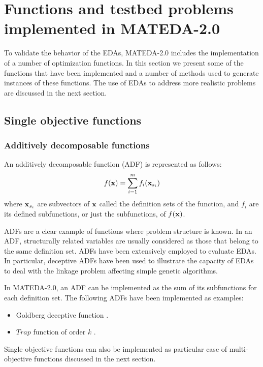 \documentclass[a4paper]{article}
\begin{document}
\section{Functions and testbed problems implemented in MATEDA-2.0}

To validate the behavior of the EDAs, MATEDA-2.0 includes the
implementation of a number of optimization functions. In this
section we present some of the functions that have been implemented
and a number of methods used to generate instances of these
functions. The use of EDAs to address more realistic problems are
discussed in the next section.

\subsection{Single objective functions}


\subsubsection{Additively decomposable functions}


An additively decomposable function (ADF) is represented as follows:
\begin{equation}
  f({\bf{x}}) = \sum_{i=1}^m f_i({\bf{x}}_{s_i})
\end{equation}
where ${\bf{x}}_{s_i}$ are subvectors  of ${\bf{x}}$ called the
definition sets of the function, and  $f_i$ are
 its defined subfunctions, or just the subfunctions, of
$f({\bf{x}})$.

 ADFs are a clear example of functions where problem structure is known.  In an
ADF, structurally related variables are usually considered as those
that belong to the same definition set. ADFs have been extensively
employed to evaluate EDAs. In particular, deceptive ADFs have been used to illustrate the capacity of
EDAs to deal with the linkage problem affecting simple genetic
algorithms.

  In MATEDA-2.0, an ADF can be implemented as the sum
  of its subfunctions for each definition set.
  The following ADFs have been implemented as examples:

\begin{itemize}
  \item Goldberg deceptive function \cite{Goldberg:1987}.
  \item $Trap$ function of order $k$ \cite{Ackley:1987}.
\end{itemize}

 Single objective functions can also be implemented as particular
 case of multi-objective functions discussed in the next section.
\end{document}
